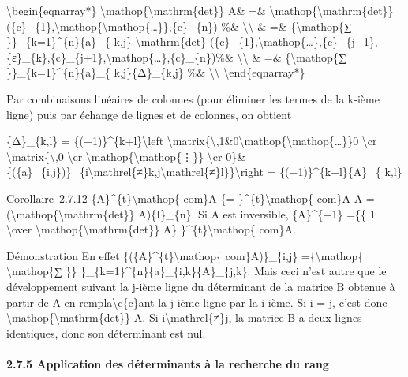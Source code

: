 \documentclass[]{article}
\begin{document}
\textbackslash{}begin\{eqnarray*\}
\textbackslash{}mathop\{\textbackslash{}mathrm\{det\}\} A\& =\&
\textbackslash{}mathop\{\textbackslash{}mathrm\{det\}\}
(\{c\}\_\{1\},\textbackslash{}mathop\{\textbackslash{}mathop\{\ldots{}\}\},\{c\}\_\{n\})
\%\& \textbackslash{}\textbackslash{} \& =\& \{\textbackslash{}mathop\{∑
\}\}\_\{k=1\}\^{}\{n\}\{a\}\_\{ k,j\} \textbackslash{}mathrm\{det\}
(\{c\}\_\{1\},\textbackslash{}mathop\{\ldots{}\},\{c\}\_\{j−1\},\{ε\}\_\{k\},\{c\}\_\{j+1\},\textbackslash{}mathop\{\ldots{}\},\{c\}\_\{n\})\%\&
\textbackslash{}\textbackslash{} \& =\& \{\textbackslash{}mathop\{∑
\}\}\_\{k=1\}\^{}\{n\}\{a\}\_\{ k,j\}\{Δ\}\_\{k,j\} \%\&
\textbackslash{}\textbackslash{} \textbackslash{}end\{eqnarray*\}

Par combinaisons linéaires de colonnes (pour éliminer les termes de la
k-ième ligne) puis par échange de lignes et de colonnes, on obtient

\{Δ\}\_\{k,l\} = \{(−1)\}\^{}\{k+l\}\textbackslash{}left
\textbar{}\textbackslash{}matrix\{\textbackslash{},1\&0\textbackslash{}mathop\{\textbackslash{}mathop\{\ldots{}\}\}0
\textbackslash{}cr \textbackslash{}matrix\{\textbackslash{},0
\textbackslash{}cr \textbackslash{}mathop\{\textbackslash{}mathop\{⋮\}\}
\textbackslash{}cr
0\}\&\{(\{a\}\_\{i,j\})\}\_\{i\textbackslash{}mathrel\{≠\}k,j\textbackslash{}mathrel\{≠\}l\}\}\textbackslash{}right
\textbar{} = \{(−1)\}\^{}\{k+l\}\{A\}\_\{ k,l\}

Corollaire~2.7.12 \{A\}\^{}\{t\}\textbackslash{}mathop\{ com\}A \{=
\}\^{}\{t\}\textbackslash{}mathop\{ com\}A A =
(\textbackslash{}mathop\{\textbackslash{}mathrm\{det\}\} A)\{I\}\_\{n\}.
Si A est inversible, \{A\}\^{}\{−1\} =\{\{ 1 \textbackslash{}over
\textbackslash{}mathop\{\textbackslash{}mathrm\{det\}\} A\}
\}\^{}\{t\}\textbackslash{}mathop\{ com\}A.

Démonstration En effet \{(\{A\}\^{}\{t\}\textbackslash{}mathop\{
com\}A)\}\_\{i,j\} =\{\textbackslash{}mathop\{ \textbackslash{}mathop\{∑
\}\} \}\_\{k=1\}\^{}\{n\}\{a\}\_\{i,k\}\{A\}\_\{j,k\}. Mais ceci n'est
autre que le développement suivant la j-ième ligne du déterminant de la
matrice B obtenue à partir de A en rempla\textbackslash{}c\{c\}ant la
j-ième ligne par la i-ième. Si i = j, c'est donc
\textbackslash{}mathop\{\textbackslash{}mathrm\{det\}\} A. Si
i\textbackslash{}mathrel\{≠\}j, la matrice B a deux lignes identiques,
donc son déterminant est nul.

\paragraph{2.7.5 Application des déterminants à la recherche du rang}
\end{document}
